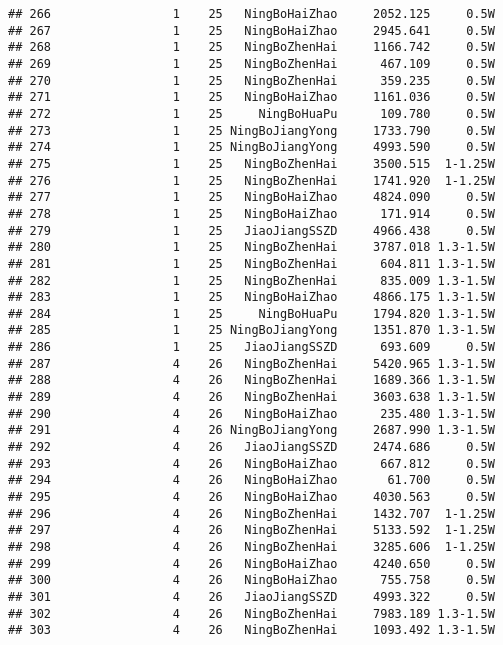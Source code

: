 \documentclass[]{article}
\begin{document}
\begin{verbatim}
## 266                 1    25   NingBoHaiZhao     2052.125     0.5W
## 267                 1    25   NingBoHaiZhao     2945.641     0.5W
## 268                 1    25   NingBoZhenHai     1166.742     0.5W
## 269                 1    25   NingBoZhenHai      467.109     0.5W
## 270                 1    25   NingBoZhenHai      359.235     0.5W
## 271                 1    25   NingBoHaiZhao     1161.036     0.5W
## 272                 1    25     NingBoHuaPu      109.780     0.5W
## 273                 1    25 NingBoJiangYong     1733.790     0.5W
## 274                 1    25 NingBoJiangYong     4993.590     0.5W
## 275                 1    25   NingBoZhenHai     3500.515  1-1.25W
## 276                 1    25   NingBoZhenHai     1741.920  1-1.25W
## 277                 1    25   NingBoHaiZhao     4824.090     0.5W
## 278                 1    25   NingBoHaiZhao      171.914     0.5W
## 279                 1    25   JiaoJiangSSZD     4966.438     0.5W
## 280                 1    25   NingBoZhenHai     3787.018 1.3-1.5W
## 281                 1    25   NingBoZhenHai      604.811 1.3-1.5W
## 282                 1    25   NingBoZhenHai      835.009 1.3-1.5W
## 283                 1    25   NingBoHaiZhao     4866.175 1.3-1.5W
## 284                 1    25     NingBoHuaPu     1794.820 1.3-1.5W
## 285                 1    25 NingBoJiangYong     1351.870 1.3-1.5W
## 286                 1    25   JiaoJiangSSZD      693.609     0.5W
## 287                 4    26   NingBoZhenHai     5420.965 1.3-1.5W
## 288                 4    26   NingBoZhenHai     1689.366 1.3-1.5W
## 289                 4    26   NingBoZhenHai     3603.638 1.3-1.5W
## 290                 4    26   NingBoHaiZhao      235.480 1.3-1.5W
## 291                 4    26 NingBoJiangYong     2687.990 1.3-1.5W
## 292                 4    26   JiaoJiangSSZD     2474.686     0.5W
## 293                 4    26   NingBoHaiZhao      667.812     0.5W
## 294                 4    26   NingBoHaiZhao       61.700     0.5W
## 295                 4    26   NingBoHaiZhao     4030.563     0.5W
## 296                 4    26   NingBoZhenHai     1432.707  1-1.25W
## 297                 4    26   NingBoZhenHai     5133.592  1-1.25W
## 298                 4    26   NingBoZhenHai     3285.606  1-1.25W
## 299                 4    26   NingBoHaiZhao     4240.650     0.5W
## 300                 4    26   NingBoHaiZhao      755.758     0.5W
## 301                 4    26   JiaoJiangSSZD     4993.322     0.5W
## 302                 4    26   NingBoZhenHai     7983.189 1.3-1.5W
## 303                 4    26   NingBoZhenHai     1093.492 1.3-1.5W

\end{verbatim}
\end{document}
